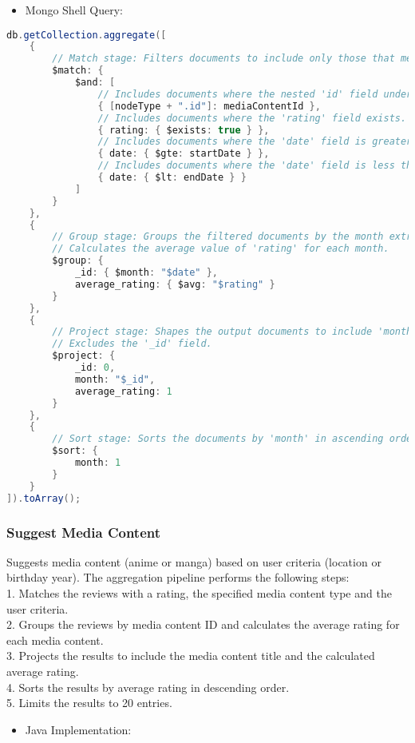 \begin{itemize}
    \item Mongo Shell Query:
\end{itemize}

\begin{mdframed}[style=customstyle]
\begin{lstlisting}[language=java]
db.getCollection.aggregate([
    { 
        // Match stage: Filters documents to include only those that meet the specified conditions.
        $match: { 
            $and: [
                // Includes documents where the nested 'id' field under 'nodeType' matches 'mediaContentId'.
                { [nodeType + ".id"]: mediaContentId },
                // Includes documents where the 'rating' field exists.
                { rating: { $exists: true } },
                // Includes documents where the 'date' field is greater than or equal to 'startDate'.
                { date: { $gte: startDate } },
                // Includes documents where the 'date' field is less than 'endDate'.
                { date: { $lt: endDate } }
            ]
        } 
    },
    { 
        // Group stage: Groups the filtered documents by the month extracted from the 'date' field.
        // Calculates the average value of 'rating' for each month.
        $group: { 
            _id: { $month: "$date" },
            average_rating: { $avg: "$rating" }
        } 
    },
    { 
        // Project stage: Shapes the output documents to include 'month' and 'average_rating' fields.
        // Excludes the '_id' field.
        $project: { 
            _id: 0,
            month: "$_id",
            average_rating: 1
        } 
    },
    { 
        // Sort stage: Sorts the documents by 'month' in ascending order.
        $sort: { 
            month: 1 
        } 
    }
]).toArray();\end{lstlisting}
\end{mdframed}

\subsubsection*{Suggest Media Content}

Suggests media content (anime or manga) based on user criteria (location or birthday year).
The aggregation pipeline performs the following steps:\\
1. Matches the reviews with a rating, the specified media content type and the user criteria.\\
2. Groups the reviews by media content ID and calculates the average rating for each media content.\\
3. Projects the results to include the media content title and the calculated average rating.\\
4. Sorts the results by average rating in descending order.\\
5. Limits the results to 20 entries.
\begin{itemize}
    \item Java Implementation:
\end{itemize}


